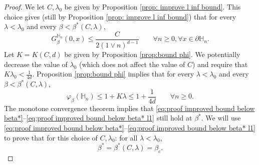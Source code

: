 \documentclass[11pt,a4paper]{article}
\numberwithin{equation}{section}
\theoremstyle{plain}
\theoremstyle{definition}
\begin{document}
\begin{proof} We let $C,\lambda_0$ be given by Proposition \ref{prop: improve l inf bound}. This choice gives (still by Proposition \ref{prop: improve l inf bound}) that for every $\lambda<\lambda_0$ and every $\beta<\beta^*(C,\lambda)$,
\begin{equation}\label{eq:proof improved bound below beta*}
	G_\beta^{\mathbb H_n}(0,x)\leq \frac{C}{2(1\vee n)^{d-1}} \qquad \forall n\geq 0, \forall x\in \partial \mathbb H_n.
\end{equation}
Let $K=K(C,d)$ be given by Proposition \ref{prop:bound phi}.
We potentially decrease the value of $\lambda_0$ (which does not affect the value of $C$) and require that $K\lambda_0<\tfrac{1}{4d}$. Proposition \ref{prop:bound phi} implies that for every $\lambda<\lambda_0$ and every $\beta<\beta^*(C,\lambda)$,
\begin{equation}\label{eq:proof improved bound below beta* l1}
	\varphi_\beta(\mathbb H_n)\leq 1+K\lambda\leq 1+\frac{1}{4d} \qquad \forall n\geq 0.
\end{equation}
The monotone convergence theorem implies that \eqref{eq:proof improved bound below beta*}--\eqref{eq:proof improved bound below beta* l1} still hold at $\beta^*$. We will use \eqref{eq:proof improved bound below beta*}--\eqref{eq:proof improved bound below beta* l1}  to prove that for this choice of $C,\lambda_0$: for all $\lambda<\lambda_0$,
\begin{equation}
	\beta^*=\beta^*(C,\lambda)=\beta_c.
\end{equation}


\end{proof}
\end{document}
